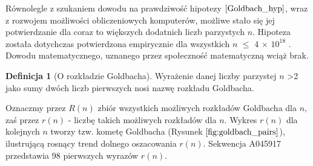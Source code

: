 \documentclass[10pt,onecolumn]{article}
\theoremstyle{definition}
\newtheorem{definition}{Definicja}
\theoremstyle{hypothesis}
\theoremstyle{capability}
\begin{document}
Równolegle z szukaniem dowodu na prawdziwość hipotezy $\ref{Goldbach_hyp}$, wraz z rozwojem możliwości obliczeniowych komputerów, możliwe stało się jej potwierdzanie dla coraz to większych dodatnich liczb parzystych $n$. Hipoteza została dotychczas potwierdzona empirycznie dla wszystkich $n$ $\leq$ 4 $\times$ $10^{18}$ \cite{oliveira2012}. Dowodu matematycznego, uznanego przez społeczność matematyczną wciąż brak.\par

\begin{definition} [O rozkładzie Goldbacha]
Wyrażenie danej liczby parzystej $n$ \textgreater 2 jako sumy dwóch liczb pierwszych nosi nazwę rozkładu Goldbacha.
\end{definition}

Oznaczmy przez $R(n)$ zbiór wszystkich możliwych rozkładów Goldbacha dla $n$, zaś przez $r(n)$ - liczbę takich możliwych rozkładów dla $n$. 
Wykres $r(n)$ dla kolejnych $n$ tworzy tzw. kometę Goldbacha (Rysunek $\ref{fig:goldbach_pairs}$), ilustrującą rosnący trend dolnego oszacowania $r(n)$. Sekwencja A045917 przedstawia 98 pierwszych wyrazów $r(n)$.
\end{document}
